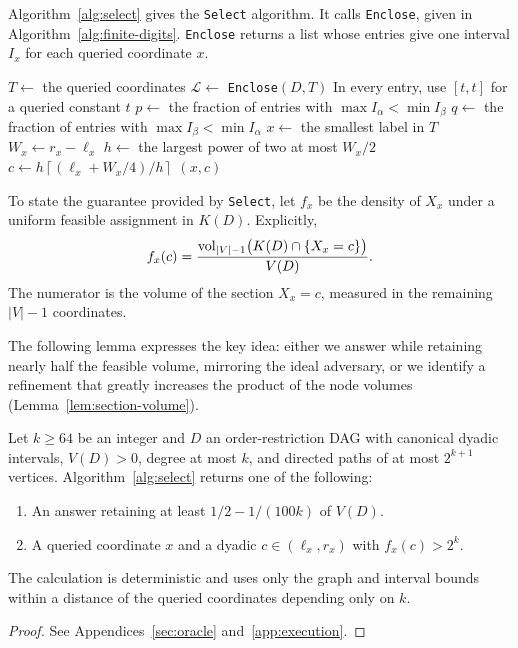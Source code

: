 Algorithm~\ref{alg:select} gives the \texttt{Select} algorithm.
It calls \texttt{Enclose}, given in Algorithm~\ref{alg:finite-digits}.
\texttt{Enclose} returns a list whose entries give one interval $I_x$
for each queried coordinate $x$.

\begin{algorithm}[H]
\caption{\texttt{Select}$(D,\alpha,\beta)$: choose an answer or a position for refinement.}
\label{alg:select}
\DontPrintSemicolon
{}
$T\gets$ the queried coordinates\;
$\mathcal L\gets$ \texttt{Enclose}$(D,T)$\;
In every entry, use $[t,t]$ for a queried constant $t$\;
$p\gets$ the fraction of entries with $\max I_\alpha<\min I_\beta$\;
$q\gets$ the fraction of entries with $\max I_\beta<\min I_\alpha$\;
$x\gets$ the smallest label in $T$\;
$W_x\gets r_x-\ell_x$\;
$h\gets$ the largest power of two at most $W_x/2$\;
$c\gets h\left\lceil(\ell_x+W_x/4)/h\right\rceil$\;
\Return $(x,c)$\;
\end{algorithm}

To state the guarantee provided by \texttt{Select}, let $f_x$ be the
density of $X_x$ under a uniform feasible assignment in $K(D)$. Explicitly,
\begin{equation}\label{eq:coordinate-density}
f_x(c)=\frac{\operatorname{vol}_{|V|-1}\bigl(K(D)\cap\{X_x=c\}\bigr)}{V(D)}.
\end{equation}
The numerator is the volume of the section $X_x=c$, measured in the
remaining $|V|-1$ coordinates.

The following lemma expresses the key idea: either we answer while retaining nearly
half the feasible volume, mirroring the ideal adversary, or we identify a
refinement that greatly increases the product of the node volumes
(Lemma~\ref{lem:section-volume}).

\begin{lemma}\label{lem:local-routines}
Let $k\ge64$ be an integer and $D$ an order-restriction DAG with canonical dyadic intervals,
$V(D)>0$, degree at most $k$, and directed paths of at most $2^{k+1}$
vertices. Algorithm~\ref{alg:select} returns one of the following:
\begin{enumerate}
\item An answer retaining at least $1/2-1/(100k)$ of $V(D)$.
\item A queried coordinate $x$ and a dyadic $c\in(\ell_x,r_x)$ with
$f_x(c)>2^k$.
\end{enumerate}
The calculation is deterministic and uses only the graph and interval
bounds within a distance of the queried coordinates depending only on $k$.
\end{lemma}
\begin{proof}
See Appendices~\ref{sec:oracle} and~\ref{app:execution}.
\end{proof}

